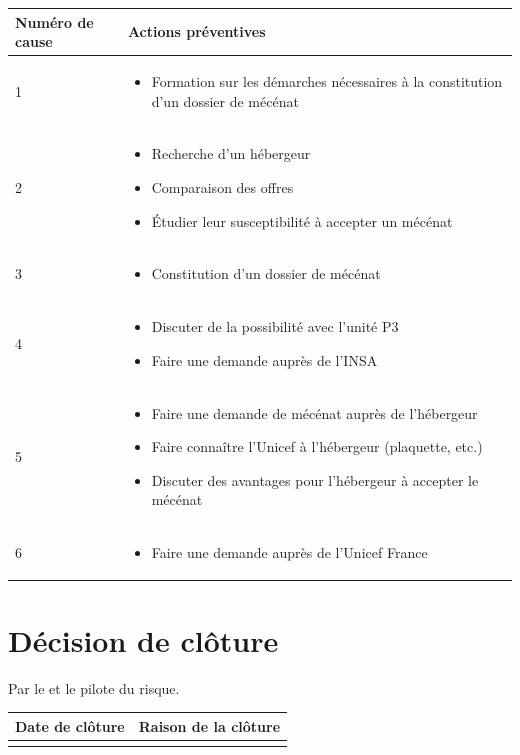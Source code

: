 {\centering
	\begin{longtable}{|p{7cm}|p{7cm}|}
	\hline
	\rowcolor{gray!40} Numéro de cause & Actions préventives \\
	\hline
	 1 & \begin{itemize}
	 	\item Formation sur les démarches nécessaires à la constitution d'un dossier de mécénat
	 \end{itemize} \\
	\hline
	2 &
	\begin{itemize}
		\item Recherche d'un hébergeur
		\item Comparaison des offres
		\item Étudier leur susceptibilité à accepter un mécénat
	\end{itemize} \\
	\hline
	3 & \begin{itemize}
		\item Constitution d'un dossier de mécénat
	\end{itemize} \\
	\hline
	4 & \begin{itemize}
		\item Discuter de la possibilité avec l'unité P3
		\item Faire une demande auprès de l'INSA
	\end{itemize} \\
	\hline
	5 & \begin{itemize}
		\item Faire une demande de mécénat auprès de l'hébergeur
		\item Faire connaître l'Unicef à l'hébergeur (plaquette, etc.)
		\item Discuter des avantages pour l'hébergeur à accepter le mécénat
	\end{itemize} \\
	\hline
	6 & \begin{itemize}
		\item Faire une demande auprès de l'Unicef France
	\end{itemize} \\
	\hline
\end{longtable}}

\section*{Décision de clôture}
Par le \CP{} et le pilote du risque.
\begin{table}[h]
\centering
	\begin{tabularx}{16.8cm}{|X|X|}
	\hline
	\rowcolor{gray!40} Date de clôture & Raison de la clôture \\
	\hline
	  & \\
	\hline
	\end{tabularx}
\end{table}


